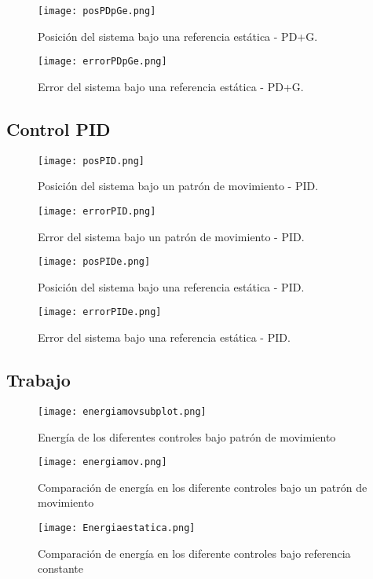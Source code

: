 \begin{figure}[h]
    \centering
    \texttt{[image: posPDpGe.png]}
    \caption{Posición del sistema bajo una referencia estática - PD+G.}
    \label{fig:PDG positione}
\end{figure}

\begin{figure}[h]
    \centering
    \texttt{[image: errorPDpGe.png]}
    \caption{Error del sistema bajo una referencia estática - PD+G.}
    \label{fig:PDG errore}
\end{figure}



\subsection{Control PID}

\begin{figure}[h]
    \centering
    \texttt{[image: posPID.png]}
    \caption{Posición del sistema bajo un patrón de movimiento - PID.}
    \label{fig:PID position}
\end{figure}

\begin{figure}[h]
    \centering
    \texttt{[image: errorPID.png]}
    \caption{Error del sistema bajo un patrón de movimiento - PID.}
    \label{fig:PID error}
\end{figure}

\begin{figure}[h]
    \centering
    \texttt{[image: posPIDe.png]}
    \caption{Posición del sistema bajo una referencia estática - PID.}
    \label{fig:PID positione}
\end{figure}

\begin{figure}[h]
    \centering
    \texttt{[image: errorPIDe.png]}
    \caption{Error del sistema bajo una referencia estática - PID.}
    \label{fig:PID errore}
\end{figure}

\subsection{Trabajo}

\begin{figure}[h]
    \centering
    \texttt{[image: energiamovsubplot.png]}
    \caption{Energía de los diferentes controles bajo patrón de movimiento}
    \label{fig:my_label}
\end{figure}

\begin{figure}[h]
    \centering
    \texttt{[image: energiamov.png]}
    \caption{Comparación de energía en los diferente controles bajo un patrón de movimiento}
    \label{fig:energiamov}
\end{figure}

\begin{figure}[h]
    \centering
    \texttt{[image: Energiaestatica.png]}
    \caption{Comparación de energía en los diferente controles bajo referencia constante}
    \label{fig:energiamov}
\end{figure}